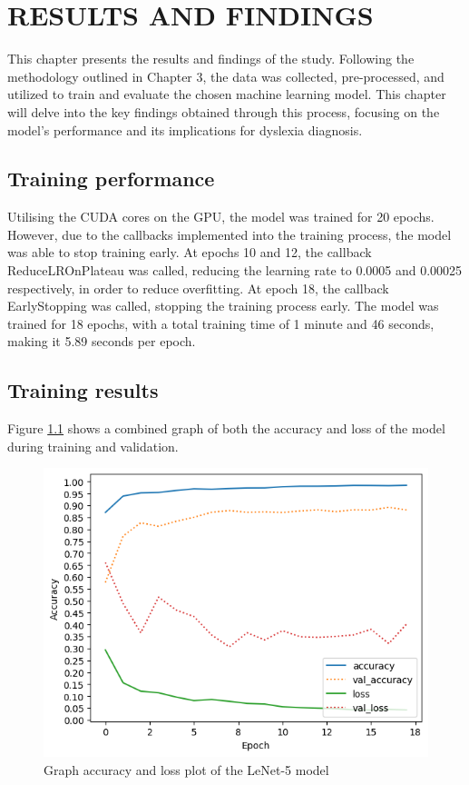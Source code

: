 \chapter{RESULTS AND FINDINGS}
\label{ch:results}

This chapter presents the results and findings of the study. Following the methodology outlined in Chapter 3, the data was collected, pre-processed, and utilized to train and evaluate the chosen machine learning model. This chapter will delve into the key findings obtained through this process, focusing on the model's performance and its implications for dyslexia diagnosis.

\section{Training performance}

Utilising the CUDA cores on the GPU, the model was trained for 20 epochs. However, due to the callbacks implemented into the training process, the model was able to stop training early. At epochs 10 and 12, the callback ReduceLROnPlateau was called, reducing the learning rate to 0.0005 and 0.00025 respectively, in order to reduce overfitting. At epoch 18, the callback EarlyStopping was called, stopping the training process early. The model was trained for 18 epochs, with a total training time of 1 minute and 46 seconds, making it 5.89 seconds per epoch. 


\section{Training results}

Figure \ref{fig:acc-loss} shows a combined graph of both the accuracy and loss of the model during training and validation.

\begin{figure}[h]
    \centering
    \includegraphics[scale=0.8]{mainmatter/images/results/acc-loss.png}
    \caption{Graph accuracy and loss plot of the LeNet-5 model}
    \label{fig:acc-loss}
\end{figure}

